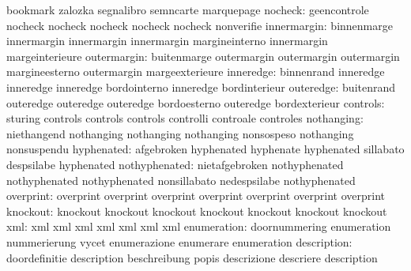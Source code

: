                            bookmark                  zalozka
                           segnalibro                semncarte
                           marquepage
                  nocheck: geencontrole              nocheck
                           nocheck                   nocheck
                           nocheck                   nocheck
                           nonverifie
              innermargin: binnenmarge               innermargin
                           innermargin               innermargin
                           margineinterno            innermargin
                           margeinterieure
              outermargin: buitenmarge               outermargin
                           outermargin               outermargin
                           margineesterno            outermargin
                           margeexterieure
                inneredge: binnenrand                inneredge
                           inneredge                 inneredge
                           bordointerno              inneredge
                           bordinterieur
                outeredge: buitenrand                outeredge
                           outeredge                 outeredge
                           bordoesterno              outeredge
                           bordexterieur
                 controls: sturing                   controls
                           controls                  controls
                           controlli                 controale
                           controles
               nothanging: niethangend               nothanging
                           nothanging                nothanging
                           nonsospeso                nothanging
                           nonsuspendu
               hyphenated: afgebroken                hyphenated
                           hyphenate                 hyphenated
                           sillabato                 despsilabe
                           hyphenated
            nothyphenated: nietafgebroken            nothyphenated
                           nothyphenated             nothyphenated
                           nonsillabato              nedespsilabe
                           nothyphenated
                overprint: overprint                 overprint
                           overprint                 overprint
                           overprint                 overprint
                           overprint
                 knockout: knockout                  knockout
                           knockout                  knockout
                           knockout                  knockout
                           knockout
                      xml: xml                       xml
                           xml                       xml
                           xml                       xml
                           xml
              enumeration: doornummering             enumeration
                           nummerierung              vycet
                           enumerazione              enumerare
                           enumeration
              description: doordefinitie             description
                           beschreibung              popis
                           descrizione               descriere
                           description

